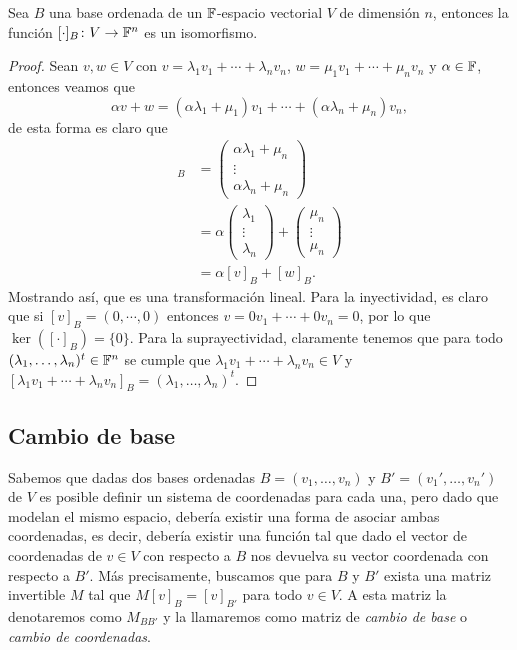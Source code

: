 \begin{prop}
  Sea $B$ una base ordenada de un $\mathbb{F}$-espacio vectorial $V$ de dimensión $n$, entonces la función $[\cdot]_B\colon V \to \mathbb{F}^n$ es un isomorfismo.
\end{prop}
\begin{proof}
  Sean $v,w \in V$ con $v = \lambda_1 v_1 + \cdots + \lambda_n v_n$, $w = \mu_1 v_1 + \cdots + \mu_n v_n$ y $\alpha \in \mathbb{F}$, entonces veamos que
  \[
  \alpha v+w =  (\alpha\lambda_1+\mu_1) v_1 + \cdots + (\alpha\lambda_n+\mu_n) v_n,
  \]
  de esta forma es claro que
  \begin{align*}
    [\alpha v+w]_B 
      &= \begin{pmatrix} \alpha\lambda_1+\mu_n \\ \vdots \\ \alpha\lambda_n+\mu_n \end{pmatrix} \\
      &= \alpha\begin{pmatrix} \lambda_1 \\ \vdots \\ \lambda_n \end{pmatrix}
       + \begin{pmatrix} \mu_n \\ \vdots \\ \mu_n  \end{pmatrix} \\
      &= \alpha[v]_B + [w]_B.
  \end{align*}
  Mostrando así, que es una transformación lineal. Para la inyectividad, es claro que si $[v]_B = (0,\cdots,0)$ entonces $v = 0v_1 + \cdots + 0v_n = 0$, por lo que $\ker([\cdot]_B) = \{0\}$. Para la suprayectividad, claramente tenemos que para todo $(\lambda_1, \ldots, \lambda_n)^t \in \mathbb{F}^n$ se cumple que $\lambda_1 v_1 + \cdots + \lambda_n v_n \in V$ y  $[\lambda_1 v_1 + \cdots  + \lambda_n v_n]_B = (\lambda_1, \ldots, \lambda_n)^t$.
\end{proof}


\subsection{Cambio de base}

Sabemos que dadas dos bases ordenadas $B = (v_1,\ldots,v_n)$ y $B' = (v_1',\ldots,v_n')$ de $V$ es posible definir un sistema de coordenadas para cada una, pero dado que modelan el mismo espacio, debería existir una forma de asociar ambas coordenadas, es decir, debería existir una función tal que dado el vector de coordenadas de $v \in V$ con respecto a $B$ nos devuelva su vector coordenada con respecto a $B'$. Más precisamente, buscamos que para $B$ y $B'$ exista una matriz invertible $M$ tal que $M [v]_B = [v]_{B'}$ para todo $v \in V$. A esta matriz la denotaremos como $M_{BB'}$ y la llamaremos como matriz de \emph{cambio de base} o \emph{cambio de coordenadas}.

